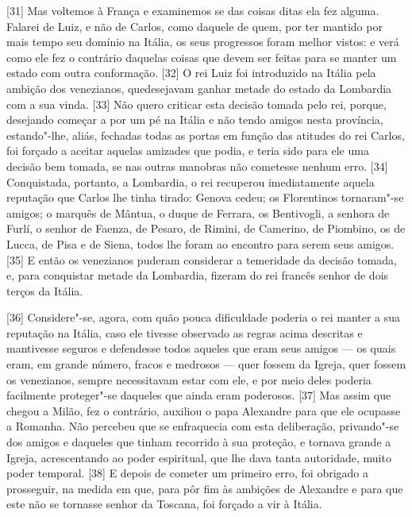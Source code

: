 {[}31{]} Mas voltemos à França e examinemos se das coisas ditas ela fez
alguma. Falarei de Luiz,
e não de Carlos, como
daquele de quem, por ter mantido por mais tempo seu domínio na Itália,
os seus progressos foram melhor vistos: e verá como ele fez o contrário
daquelas coisas que devem ser feitas para se manter um estado com outra
conformação. {[}32{]} O rei Luiz foi introduzido na Itália pela ambição
dos venezianos, quedesejavam ganhar metade do estado da Lombardia com a
sua vinda. {[}33{]} Não quero criticar esta decisão tomada pelo rei,
porque, desejando começar a por um pé na Itália e não tendo amigos nesta
província, estando"-lhe, aliás, fechadas todas as portas em função das
atitudes do rei Carlos, foi forçado a aceitar aquelas amizades que
podia, e teria sido para ele uma decisão bem tomada, se nas outras
manobras não cometesse nenhum erro. {[}34{]} Conquistada, portanto, a
Lombardia, o rei recuperou imediatamente aquela reputação que Carlos lhe
tinha tirado: Genova cedeu; os Florentinos tornaram"-se amigos; o marquês
de Mântua, o duque
de Ferrara, os Bentivogli, a senhora de Furlí, o senhor de
Faenza, de Pesaro, de Rimini, de
Camerino, de Piombino, os de Lucca, de Pisa e de Siena, todos lhe foram ao
encontro para serem seus amigos. {[}35{]} E então os venezianos puderam
considerar a temeridade da decisão tomada, e, para conquistar metade da
Lombardia, fizeram do rei francês senhor de dois terços da Itália.

{[}36{]} Considere"-se, agora, com quão pouca dificuldade poderia o rei
manter a sua reputação na Itália, caso ele tivesse observado as regras
acima descritas e mantivesse seguros e defendesse todos aqueles que eram
seus amigos --- os quais eram, em grande número, fracos e medrosos ---
quer fossem da Igreja, quer fossem os venezianos, sempre necessitavam
estar com ele, e por meio deles poderia facilmente proteger"-se daqueles
que ainda eram poderosos. {[}37{]} Mas assim que chegou a Milão, fez o
contrário, auxiliou o papa Alexandre para que ele ocupasse a Romanha. Não percebeu que se
enfraquecia com esta deliberação, privando"-se dos amigos e daqueles que
tinham recorrido à sua proteção, e tornava grande a Igreja,
acrescentando ao poder espiritual, que lhe dava tanta autoridade, muito
poder temporal. {[}38{]} E depois de cometer um primeiro erro, foi
obrigado a prosseguir, na medida em que, para pôr fim às ambições de
Alexandre e para que este não se tornasse senhor da Toscana, foi forçado
a vir à Itália.

